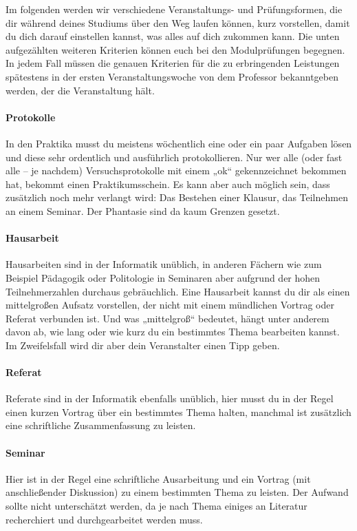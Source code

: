 Im folgenden werden wir verschiedene Veranstaltungs- und Prüfungsformen, die dir während deines Studiums über den Weg laufen können, kurz vorstellen, damit du dich darauf einstellen kannst, was alles auf dich zukommen kann. Die unten aufgezählten weiteren Kriterien können euch bei den Modulprüfungen begegnen. In jedem Fall müssen die genauen Kriterien für die zu erbringenden Leistungen spätestens in der ersten Veranstaltungswoche von dem Professor bekanntgeben werden, der die Veranstaltung hält.


\paragraph{Protokolle} In den Praktika musst du meistens wöchentlich eine oder ein paar Aufgaben lösen und diese sehr ordentlich und ausführlich protokollieren. Nur wer alle (oder fast alle – je nachdem) Versuchsprotokolle mit einem „ok“ gekennzeichnet bekommen hat, bekommt einen Praktikumsschein. Es kann aber auch möglich sein, dass zusätzlich noch mehr verlangt wird: Das Bestehen einer Klausur, das Teilnehmen an einem Seminar. Der Phantasie sind da kaum Grenzen gesetzt.


\paragraph{Hausarbeit} Hausarbeiten sind in der Informatik unüblich, in anderen Fächern wie zum Beispiel Pädagogik oder Politologie in Seminaren aber aufgrund der hohen Teilnehmerzahlen durchaus gebräuchlich. Eine Hausarbeit kannst du dir als einen mittelgroßen Aufsatz vorstellen, der nicht mit einem mündlichen Vortrag oder Referat verbunden ist. Und was „mittelgroß“ bedeutet, hängt unter anderem davon ab, wie lang oder wie kurz du ein bestimmtes Thema bearbeiten kannst. Im Zweifelsfall wird dir aber dein Veranstalter einen Tipp geben.


\paragraph{Referat} Referate sind in der Informatik ebenfalls unüblich, hier musst du in der Regel einen kurzen Vortrag über ein bestimmtes Thema halten, manchmal ist zusätzlich eine schriftliche Zusammenfassung zu leisten.


\paragraph{Seminar} Hier ist in der Regel eine schriftliche Ausarbeitung und ein Vortrag (mit anschließender Diskussion) zu einem bestimmten Thema zu leisten. Der Aufwand sollte nicht unterschätzt werden, da je nach Thema einiges an Literatur recherchiert und durchgearbeitet werden muss.

